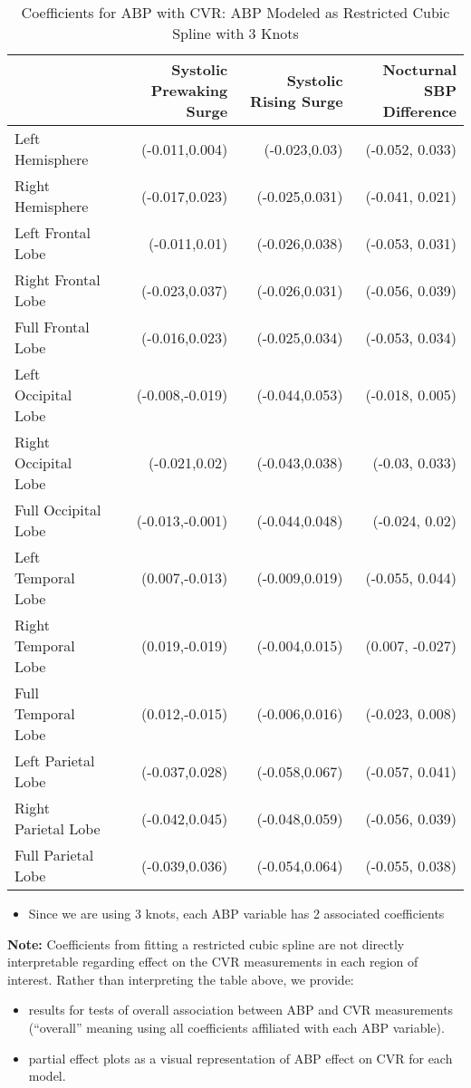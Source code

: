 \documentclass[10pt]{article}\usepackage[]{graphicx}\usepackage[]{color}
\begin{document}
\begin{table}[ht]
\centering
\caption{Coefficients for ABP with CVR: ABP Modeled as Restricted Cubic Spline with 3 Knots} 
\begin{tabular}{lrrr}
  \toprule
 & Systolic Prewaking Surge & Systolic Rising Surge & Nocturnal SBP Difference \\ 
  \midrule
Left Hemisphere & (-0.011,0.004) & (-0.023,0.03) & (-0.052,  0.033) \\ 
  Right Hemisphere & (-0.017,0.023) & (-0.025,0.031) & (-0.041,  0.021) \\ 
  Left Frontal Lobe & (-0.011,0.01) & (-0.026,0.038) & (-0.053,  0.031) \\ 
  Right Frontal Lobe & (-0.023,0.037) & (-0.026,0.031) & (-0.056,  0.039) \\ 
  Full Frontal Lobe & (-0.016,0.023) & (-0.025,0.034) & (-0.053,  0.034) \\ 
  Left Occipital Lobe & (-0.008,-0.019) & (-0.044,0.053) & (-0.018,  0.005) \\ 
  Right Occipital Lobe & (-0.021,0.02) & (-0.043,0.038) & (-0.03,  0.033) \\ 
  Full Occipital Lobe & (-0.013,-0.001) & (-0.044,0.048) & (-0.024,  0.02) \\ 
  Left Temporal Lobe & (0.007,-0.013) & (-0.009,0.019) & (-0.055,  0.044) \\ 
  Right Temporal Lobe & (0.019,-0.019) & (-0.004,0.015) & (0.007,  -0.027) \\ 
  Full Temporal Lobe & (0.012,-0.015) & (-0.006,0.016) & (-0.023,  0.008) \\ 
  Left Parietal Lobe & (-0.037,0.028) & (-0.058,0.067) & (-0.057,  0.041) \\ 
  Right Parietal Lobe & (-0.042,0.045) & (-0.048,0.059) & (-0.056,  0.039) \\ 
  Full Parietal Lobe & (-0.039,0.036) & (-0.054,0.064) & (-0.055,  0.038) \\ 
   \bottomrule
\end{tabular}
\end{table}


\begin{itemize}
  \item Since we are using 3 knots, each ABP variable has 2 associated coefficients
\end{itemize}

{\bf Note:} Coefficients from fitting a restricted cubic spline are not directly interpretable regarding effect on the CVR measurements in each region of interest. Rather than interpreting the table above, we provide:\\
\begin{itemize}
  \item results for tests of overall association between ABP and CVR measurements (``overall'' meaning using all coefficients affiliated with each ABP variable).
  \item partial effect plots as a visual representation of ABP effect on CVR for each model.
  \end{itemize}
\end{document}
